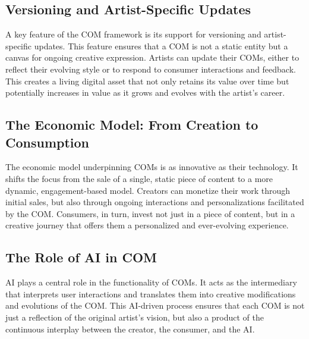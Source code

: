 \documentclass[12pt,a4paper]{article}
\begin{document}
\subsection{Versioning and Artist-Specific Updates}

A key feature of the COM framework is its support for versioning and artist-specific updates. This feature ensures that a COM is not a static entity but a canvas for ongoing creative expression. Artists can update their COMs, either to reflect their evolving style or to respond to consumer interactions and feedback. This creates a living digital asset that not only retains its value over time but potentially increases in value as it grows and evolves with the artist's career.

\subsection{The Economic Model: From Creation to Consumption}

The economic model underpinning COMs is as innovative as their technology. It shifts the focus from the sale of a single, static piece of content to a more dynamic, engagement-based model. Creators can monetize their work through initial sales, but also through ongoing interactions and personalizations facilitated by the COM. Consumers, in turn, invest not just in a piece of content, but in a creative journey that offers them a personalized and ever-evolving experience.

\subsection{The Role of AI in COM}

AI plays a central role in the functionality of COMs. It acts as the intermediary that interprets user interactions and translates them into creative modifications and evolutions of the COM. This AI-driven process ensures that each COM is not just a reflection of the original artist's vision, but also a product of the continuous interplay between the creator, the consumer, and the AI.

\noindent{}
\end{document}
